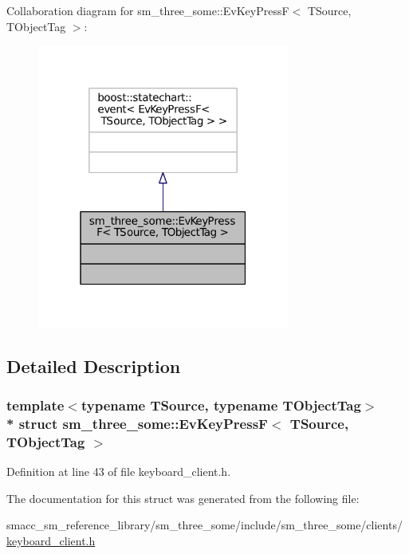 Collaboration diagram for sm\+\_\+three\+\_\+some\+:\+:Ev\+Key\+PressF$<$ T\+Source, T\+Object\+Tag $>$\+:
\nopagebreak
\begin{figure}[H]
\begin{center}
\leavevmode
\includegraphics[width=235pt]{structsm__three__some_1_1EvKeyPressF__coll__graph}
\end{center}
\end{figure}


\subsection{Detailed Description}
\subsubsection*{template$<$typename T\+Source, typename T\+Object\+Tag$>$\\*
struct sm\+\_\+three\+\_\+some\+::\+Ev\+Key\+Press\+F$<$ T\+Source, T\+Object\+Tag $>$}



Definition at line 43 of file keyboard\+\_\+client.\+h.



The documentation for this struct was generated from the following file\+:\begin{DoxyCompactItemize}
\item 
smacc\+\_\+sm\+\_\+reference\+\_\+library/sm\+\_\+three\+\_\+some/include/sm\+\_\+three\+\_\+some/clients/\hyperlink{keyboard__client_8h}{keyboard\+\_\+client.\+h}\end{DoxyCompactItemize}
